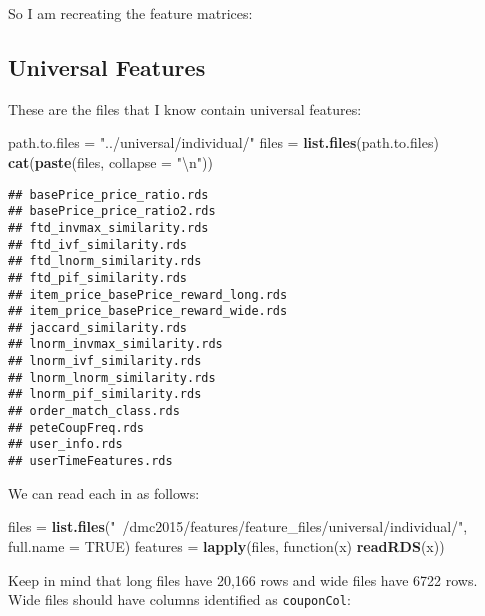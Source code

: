 \documentclass[10pt]{report}
\newenvironment{Shaded}{}{}
\newcommand{\KeywordTok}[1]{\textcolor[rgb]{0.00,0.44,0.13}{\textbf{{#1}}}}
\newcommand{\DataTypeTok}[1]{\textcolor[rgb]{0.56,0.13,0.00}{{#1}}}
\newcommand{\CharTok}[1]{\textcolor[rgb]{0.25,0.44,0.63}{{#1}}}
\newcommand{\StringTok}[1]{\textcolor[rgb]{0.25,0.44,0.63}{{#1}}}
\newcommand{\OtherTok}[1]{\textcolor[rgb]{0.00,0.44,0.13}{{#1}}}
\newcommand{\NormalTok}[1]{{#1}}
\begin{document}
So I am recreating the feature matrices:

\subsection{Universal Features}\label{universal-features}

These are the files that I know contain universal features:

\begin{Shaded}
\begin{Highlighting}[]
\NormalTok{path.to.files =}\StringTok{ "../universal/individual/"}
\NormalTok{files =}\StringTok{ }\KeywordTok{list.files}\NormalTok{(path.to.files)}
\KeywordTok{cat}\NormalTok{(}\KeywordTok{paste}\NormalTok{(files, }\DataTypeTok{collapse =} \StringTok{"}\CharTok{\textbackslash{}n}\StringTok{"}\NormalTok{))}
\end{Highlighting}
\end{Shaded}

\begin{verbatim}
## basePrice_price_ratio.rds
## basePrice_price_ratio2.rds
## ftd_invmax_similarity.rds
## ftd_ivf_similarity.rds
## ftd_lnorm_similarity.rds
## ftd_pif_similarity.rds
## item_price_basePrice_reward_long.rds
## item_price_basePrice_reward_wide.rds
## jaccard_similarity.rds
## lnorm_invmax_similarity.rds
## lnorm_ivf_similarity.rds
## lnorm_lnorm_similarity.rds
## lnorm_pif_similarity.rds
## order_match_class.rds
## peteCoupFreq.rds
## user_info.rds
## userTimeFeatures.rds
\end{verbatim}

We can read each in as follows:

\begin{Shaded}
\begin{Highlighting}[]
\NormalTok{files =}\StringTok{ }\KeywordTok{list.files}\NormalTok{(}\StringTok{"~/dmc2015/features/feature_files/universal/individual/"}\NormalTok{, }
    \DataTypeTok{full.name =} \OtherTok{TRUE}\NormalTok{)}
\NormalTok{features =}\StringTok{ }\KeywordTok{lapply}\NormalTok{(files, function(x) }\KeywordTok{readRDS}\NormalTok{(x))}
\end{Highlighting}
\end{Shaded}

Keep in mind that long files have 20,166 rows and wide files have 6722
rows. Wide files should have columns identified as \verb!couponCol!:
\end{document}

